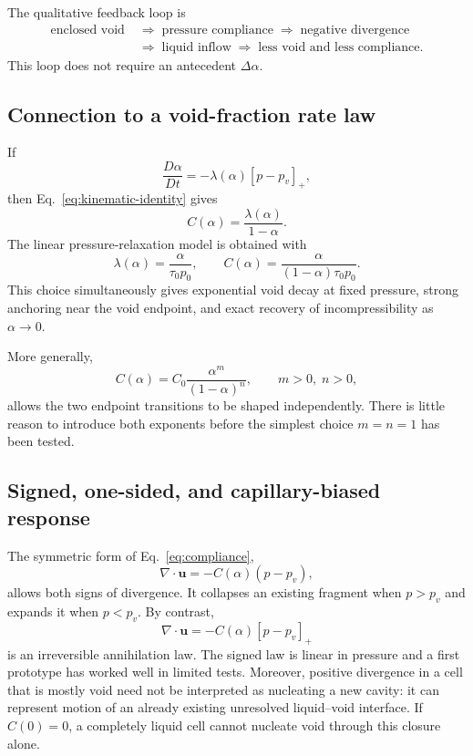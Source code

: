 \documentclass[11pt]{article}
\newcommand{\pos}[1]{\left[#1\right]_+}
\newcommand{\divg}{\nabla\!\cdot}
\newcommand{\uv}{\boldsymbol{u}}
\begin{document}
The qualitative feedback loop is
\begin{align*}
  \text{enclosed void}
  &\;\Rightarrow\;
  \text{pressure compliance}
  \;\Rightarrow\;
  \text{negative divergence}\\
  &\;\Rightarrow\;
  \text{liquid inflow}
  \;\Rightarrow\;
  \text{less void and less compliance}.
\end{align*}
This loop does not require an antecedent \(\Delta\alpha\).

\subsection{Connection to a void-fraction rate law}

If
\begin{equation}
  \frac{D\alpha}{Dt}=-\lambda(\alpha)\pos{p-p_v},
\end{equation}
then Eq.~\eqref{eq:kinematic-identity} gives
\begin{equation}
  C(\alpha)=\frac{\lambda(\alpha)}{1-\alpha}.
\end{equation}
The linear pressure-relaxation model is obtained with
\begin{equation}
  \lambda(\alpha)=\frac{\alpha}{\tau_0p_0},
  \qquad
  \boxed{C(\alpha)=
  \frac{\alpha}{(1-\alpha)\tau_0p_0}.}
  \label{eq:simple-compliance}
\end{equation}
This choice simultaneously gives exponential void decay at fixed pressure, strong
anchoring near the void endpoint, and exact recovery of incompressibility as
\(\alpha\to0\).

More generally,
\begin{equation}
  C(\alpha)=C_0\frac{\alpha^m}{(1-\alpha)^n},
  \qquad m>0,\;n>0,
\end{equation}
allows the two endpoint transitions to be shaped independently.  There is little reason
to introduce both exponents before the simplest choice \(m=n=1\) has been tested.

\subsection{Signed, one-sided, and capillary-biased response}

The symmetric form of Eq.~\eqref{eq:compliance},
\begin{equation}
  \divg\uv=-C(\alpha)(p-p_v),
  \label{eq:signed-compliance}
\end{equation}
allows both signs of divergence.  It collapses an existing fragment when \(p>p_v\) and
expands it when \(p<p_v\).  By contrast,
\begin{equation}
  \divg\uv=-C(\alpha)\pos{p-p_v}
  \label{eq:one-sided-compliance}
\end{equation}
is an irreversible annihilation law.  The signed law is linear in pressure and a first
prototype has worked well in limited tests.  Moreover, positive divergence in a cell
that is mostly void need not be interpreted as nucleating a new cavity: it can represent
motion of an already existing unresolved liquid--void interface.  If \(C(0)=0\), a
completely liquid cell cannot nucleate void through this closure alone.
\end{document}
